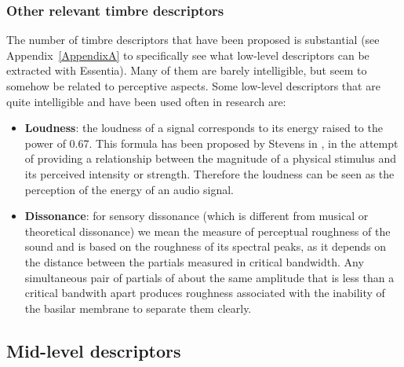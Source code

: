 \subsubsection*{Other relevant timbre descriptors}
The number of timbre descriptors that have been proposed is substantial (see Appendix~\ref{AppendixA} to specifically see what low-level descriptors can be extracted with Essentia). Many of them are barely intelligible, but seem to somehow be related to perceptive aspects. Some low-level descriptors that are quite intelligible and have been used often in research are:
\begin{itemize}
\item \textbf{Loudness}: the loudness of a signal corresponds to its energy raised to the power of 0.67. This formula has been proposed by Stevens in \cite{stevens57}, in the attempt of providing a relationship between the magnitude of a physical stimulus and its perceived intensity or strength. Therefore the loudness can be seen as the perception of the energy of an audio signal.
\item \textbf{Dissonance}: for sensory dissonance (which is different from musical or theoretical dissonance) we mean the measure of perceptual roughness of the sound and is based on the roughness of its spectral peaks, as it depends on the distance between the partials measured in critical bandwidth. Any simultaneous pair of partials of about the same amplitude that is less than a critical bandwith apart produces roughness associated with the inability of the basilar membrane to separate them clearly. 
\end{itemize}

\subsection{Mid-level descriptors}

